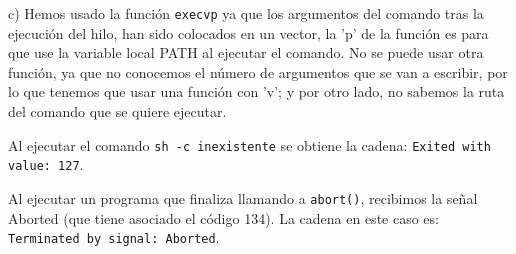 \documentclass{article}
\begin{document}
c) Hemos usado la función \texttt{execvp} ya que los argumentos del comando tras la ejecución del hilo, han sido colocados en un vector, la 'p' de la función es para que use la variable local PATH al ejecutar el comando. No se puede usar otra función, ya que no conocemos el número de argumentos que se van a escribir, por lo que tenemos que usar una función con 'v'; y por otro lado, no sabemos la ruta del comando que se quiere ejecutar.

Al ejecutar el comando \texttt{sh -c inexistente} se obtiene la cadena: \texttt{Exited with value: 127}.

Al ejecutar un programa que finaliza llamando a \texttt{abort()}, recibimos la señal Aborted (que tiene asociado el código 134). La cadena en este caso es: \texttt{Terminated by signal: Aborted}.
\end{document}
